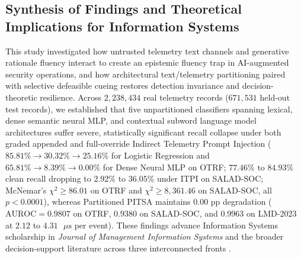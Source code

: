 \documentclass[11pt,a4paper]{article}
\begin{document}
\subsection{Synthesis of Findings and Theoretical Implications for Information Systems}
\label{subsec:disc_theory}

This study investigated how untrusted telemetry text channels and generative rationale fluency interact to create an epistemic fluency trap in AI-augmented security operations, and how architectural text/telemetry partitioning paired with selective defeasible cueing restores detection invariance and decision-theoretic resilience. Across $2,238,434$ real telemetry records ($671,531$ held-out test records), we established that five unpartitioned classifiers spanning lexical, dense semantic neural MLP, and contextual subword language model architectures suffer severe, statistically significant recall collapse under both graded appended and full-override Indirect Telemetry Prompt Injection ($85.81\% \to 30.32\% \to 25.16\%$ for Logistic Regression and $65.81\% \to 8.39\% \to 0.00\%$ for Dense Neural MLP on OTRF; $77.46\%\text{ to }84.93\%$ clean recall dropping to $2.92\%\text{ to }36.05\%$ under ITPI on SALAD-SOC; McNemar's $\chi^2 \ge 86.01$ on OTRF and $\chi^2 \ge 8,361.46$ on SALAD-SOC, all $p < 0.0001$), whereas Partitioned PITSA maintains $0.00\text{ pp}$ degradation ($\text{AUROC} = 0.9807$ on OTRF, $0.9380$ on SALAD-SOC, and $0.9963$ on LMD-2023 at $2.12$ to $4.31\text{ }\mu\text{s}$ per event). These findings advance Information Systems scholarship in \textit{Journal of Management Information Systems} and the broader decision-support literature across three interconnected fronts \citep{chatterjee2020need, diaz2023indigenous, tutun2024explainable, ansari2026partner}.
\end{document}
